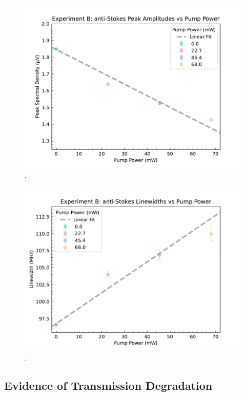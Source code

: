 \begin{figure}[t!]
  \centering
  \includegraphics[width=\textwidth]{figs/3-Cooling/P-P anti-Stokes Height v Pow.pdf}
  \caption{.}
  \label{fig:Cooling:P-P anti-Stokes Height v Pow}
\end{figure}

\begin{figure}[t!]
  \centering
  \includegraphics[width=\textwidth]{figs/3-Cooling/P-P anti-Stokes Wid v Pow.pdf}
  \caption{.}
  \label{fig:Cooling:P-P anti-Stokes Wid v Pow}
\end{figure}

\subsection{Evidence of Transmission Degradation}
\label{Cooling:subsec:Evidence of Transmission Degradation}


